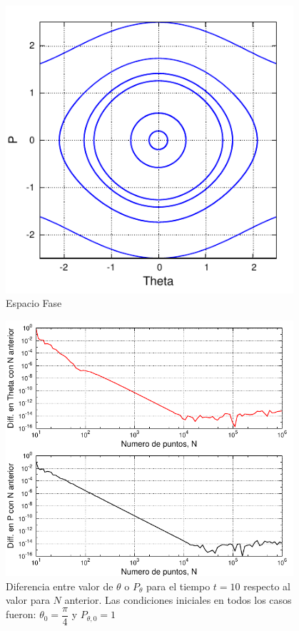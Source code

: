 \documentclass[12pt,letterpaper]{article}
\begin{document}
\begin{figure}
\centering
\includegraphics[width=0.95\textwidth]{Phase_Space.pdf}
\caption{Espacio Fase}
\end{figure}
\begin{figure}
\centering
\includegraphics[width=0.95\textwidth]{Dep_N.pdf}
\caption{Diferencia entre valor de $\theta$ o $P_{\theta}$ para el tiempo $t=10$ respecto al valor para $N$ anterior. Las condiciones iniciales en todos los casos fueron: $\theta_0 = \dfrac{\pi}{4}$ y $P_{\theta,0} =  1$}
\end{figure}
\end{document}
